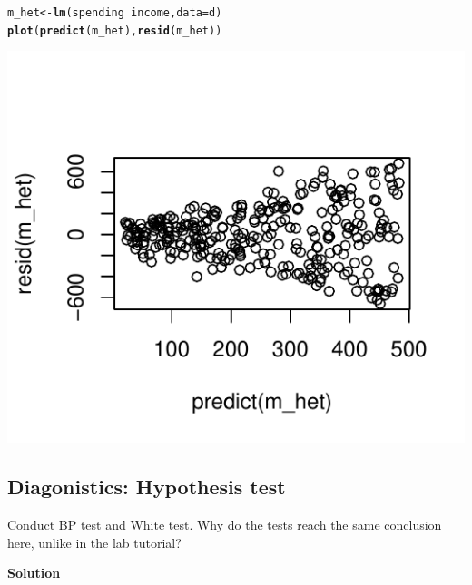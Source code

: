 \documentclass{article}\usepackage[]{graphicx}\usepackage[]{color}
\makeatletter
\def\maxwidth{ %
  \ifdim\Gin@nat@width>\linewidth
    \linewidth
  \else
    \Gin@nat@width
  \fi
}
\newcommand{\hlopt}[1]{\textcolor[rgb]{0,0,0}{#1}}%
\newcommand{\hlstd}[1]{\textcolor[rgb]{0.345,0.345,0.345}{#1}}%
\newcommand{\hlkwb}[1]{\textcolor[rgb]{0.69,0.353,0.396}{#1}}%
\newcommand{\hlkwc}[1]{\textcolor[rgb]{0.333,0.667,0.333}{#1}}%
\newcommand{\hlkwd}[1]{\textcolor[rgb]{0.737,0.353,0.396}{\textbf{#1}}}%
\newenvironment{kframe}{%
 \def\at@end@of@kframe{}%
 \ifinner\ifhmode%
  \def\at@end@of@kframe{\end{minipage}}%
  \begin{minipage}{\columnwidth}%
 \fi\fi%
 \def\FrameCommand##1{\hskip\@totalleftmargin \hskip-\fboxsep
 \colorbox{shadecolor}{##1}\hskip-\fboxsep
     \hskip-\linewidth \hskip-\@totalleftmargin \hskip\columnwidth}%
 \MakeFramed {\advance\hsize-\width
   \@totalleftmargin\z@ \linewidth\hsize
   \@setminipage}}%
 {\par\unskip\endMakeFramed%
 \at@end@of@kframe}
\newenvironment{knitrout}{}{} %
\makeatother
\begin{document}
\begin{knitrout}
\color{fgcolor}\begin{kframe}
\begin{alltt}
\hlstd{m_het} \hlkwb{<-} \hlkwd{lm}\hlstd{(spending} \hlopt{~} \hlstd{income,} \hlkwc{data} \hlstd{= d)}
\hlkwd{plot}\hlstd{(}\hlkwd{predict}\hlstd{(m_het),} \hlkwd{resid}\hlstd{(m_het))}
\end{alltt}
\end{kframe}
\includegraphics[width=\maxwidth]{figure/unnamed-chunk-4-1} 

\end{knitrout}

\subsection{Diagonistics: Hypothesis test}

Conduct BP test and White test. Why do the tests reach the same conclusion here, unlike in the lab tutorial?

\textbf{Solution}
\end{document}
